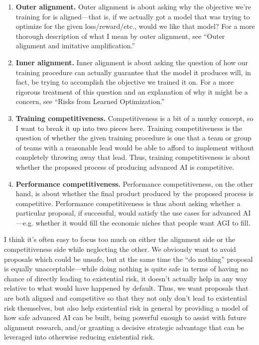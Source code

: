 \documentclass[
  onecolumn,
  natbib,
]{miri-tech-article}
\begin{document}
\begin{enumerate}
\item \textbf{Outer alignment.} Outer alignment is about asking why the objective we're training for is aligned---that is, if we actually got a model that was trying to optimize for the given loss/reward/etc., would we like that model? For a more thorough description of what I mean by outer alignment, see ``Outer alignment and imitative amplification\cite{TODO: cite https://www.alignmentforum.org/posts/33EKjmAdKFn3pbKPJ/outer-alignment-and-imitative-amplification}.''
\item \textbf{Inner alignment.} Inner alignment is about asking the question of how our training procedure can actually guarantee that the model it produces will, in fact, be trying to accomplish the objective we trained it on. For a more rigorous treatment of this question and an explanation of why it might be a concern, see ``Risks from Learned Optimization\cite{TODO: cite https://arxiv.org/abs/1906.01820}.''
\item \textbf{Training competitiveness.} Competitiveness is a bit of a murky concept, so I want to break it up into two pieces here. Training competitiveness is the question of whether the given training procedure is one that a team or group of teams with a reasonable lead would be able to afford to implement without completely throwing away that lead. Thus, training competitiveness is about whether the proposed process of producing advanced AI is competitive.
\item \textbf{Performance competitiveness.} Performance competitiveness, on the other hand, is about whether the final product produced by the proposed process is competitive. Performance competitiveness is thus about asking whether a particular proposal, if successful, would satisfy the use cases for advanced AI---e.g. whether it would fill the economic niches that people want AGI to fill.
\end{enumerate}

I think it's often easy to focus too much on either the alignment side or the competitiveness side while neglecting the other. We obviously want to avoid proposals which could be unsafe, but at the same time the ``do nothing'' proposal is equally unacceptable---while doing nothing is quite safe in terms of having no chance of directly leading to existential risk, it doesn't actually help in any way relative to what would have happened by default. Thus, we want proposals that are both aligned and competitive so that they not only don't lead to existential risk themselves, but also help existential risk in general by providing a model of how safe advanced AI can be built, being powerful enough to assist with future alignment research, and/or granting a decisive strategic advantage\cite{TODO: cite https://www.lesswrong.com/posts/vkjWGJrFWBnzHtxrw/superintelligence-7-decisive-strategic-advantage} that can be leveraged into otherwise reducing existential risk.
\end{document}
